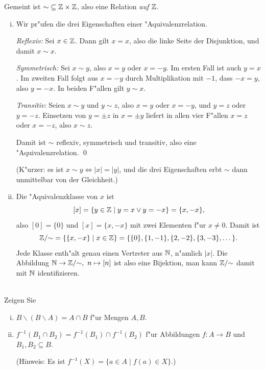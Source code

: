 \begin{loesung}
Gemeint ist ${\sim}\subseteq\mathbb{Z}\times\mathbb{Z}$, also eine Relation \emph{auf} $\mathbb{Z}$.
\begin{enumerate}[(i)]
\item Wir pr"ufen die drei Eigenschaften einer "Aquivalenzrelation.

\emph{Reflexiv:} Sei $x\in\mathbb{Z}$. Dann gilt $x=x$, also die linke Seite der Disjunktion, und damit $x\sim x$.

\emph{Symmetrisch:} Sei $x\sim y$, also $x=y$ oder $x=-y$. Im ersten Fall ist auch $y=x$. Im zweiten Fall folgt aus $x=-y$ durch Multiplikation mit $-1$, dass $-x=y$, also $y=-x$. In beiden F"allen gilt $y\sim x$.

\emph{Transitiv:} Seien $x\sim y$ und $y\sim z$, also $x=y$ oder $x=-y$, und $y=z$ oder $y=-z$. Einsetzen von $y=\pm z$ in $x=\pm y$ liefert in allen vier F"allen $x=z$ oder $x=-z$, also $x\sim z$.

Damit ist $\sim$ reflexiv, symmetrisch und transitiv, also eine "Aquivalenzrelation. \qed

(K"urzer: es ist $x\sim y\Leftrightarrow |x|=|y|$, und die drei Eigenschaften erbt $\sim$ dann unmittelbar von der Gleichheit.)

\item Die "Aquivalenzklasse von $x$ ist
\[[x]=\{y\in\mathbb{Z}\mid y=x\vee y=-x\}=\{x,-x\},\]
also $[0]=\{0\}$ und $[x]=\{x,-x\}$ mit zwei Elementen f"ur $x\neq 0$. Damit ist
\[\mathbb{Z}/{\sim}=\{\{x,-x\}\mid x\in\mathbb{Z}\}=\{\{0\},\{1,-1\},\{2,-2\},\{3,-3\},\dots\}.\]
Jede Klasse enth"alt genau einen Vertreter aus $\mathbb{N}$, n"amlich $|x|$. Die Abbildung $\NN\to\ZZ/{\sim},\ n\mapsto[n]$ ist also eine Bijektion, man kann $\mathbb{Z}/{\sim}$ damit mit $\mathbb{N}$ identifizieren.
\end{enumerate}
\end{loesung}

\\
Zeigen Sie
\begin{enumerate}[(i)]
    \item $B\backslash (B\backslash A)=A\cap B$ f"ur Mengen $A,B$.
    \item $f^{-1}(B_1\cap B_2)=f^{-1}(B_1)\cap f^{-1}(B_2)$ f"ur Abbildungen $f:A\to B$ und $B_1,B_2\subseteq B$. 
    
    (Hinweis: Es ist $f^{-1}(X)=\{a\in A\mid f(a)\in X\}$.)
\end{enumerate}

